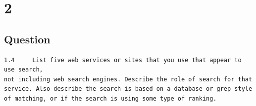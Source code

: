 \documentclass[letterpaper,11pt]{article}
\newcommand*{\srcPath}{../src}%
\begin{document}

\clearpage

% 

\clearpage




\clearpage


\section*{2}

\subsection*{Question}

\begin{verbatim}
1.4 	List five web services or sites that you use that appear to use search, 
not including web search engines. Describe the role of search for that 
service. Also describe the search is based on a database or grep style
of matching, or if the search is using some type of ranking.
\end{verbatim}
\end{document}
